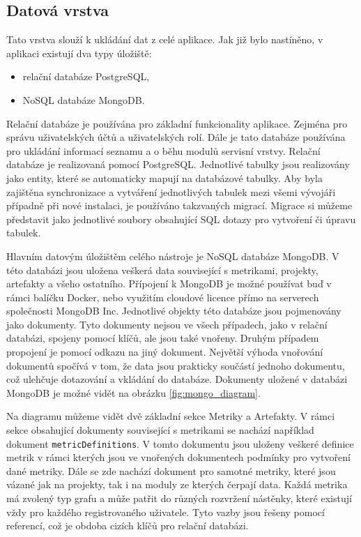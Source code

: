 \documentclass[czech,master]{diploma}
\begin{document}
\subsection{Datová vrstva}
Tato vrstva slouží k ukládání dat z celé aplikace. Jak již bylo nastíněno, v aplikaci existují dva typy úložiště:

\begin{itemize}
\item relační databáze PostgreSQL,
\item NoSQL databáze MongoDB.
\end{itemize}

Relační databáze je používána pro základní funkcionality aplikace. Zejména pro správu uživatelských účtů a uživatelských rolí. Dále je tato databáze používána pro ukládání informací seznamu a o běhu modulů servisní vrstvy. Relační databáze je realizovaná pomocí PostgreSQL. Jednotlivé tabulky jsou realizovány jako entity, které se automaticky mapují na databázové tabulky. Aby byla zajištěna synchronizace a vytváření jednotlivých tabulek mezi všemi vývojáři případně při nové instalaci, je používáno takzvaných migrací. Migrace si můžeme představit jako jednotlivé soubory obsahující SQL dotazy pro vytvoření či úpravu tabulek.

Hlavním datovým úložištěm celého nástroje je NoSQL databáze MongoDB. V této databázi jsou uložena veškerá data související s metrikami, projekty, artefakty a všeho ostatního. Přípojení k MongoDB je možné používat buď v rámci balíčku Docker, nebo využitím cloudové licence přímo na serverech společnosti MongoDB Inc. Jednotlivé objekty této databáze jsou pojmenovány jako dokumenty. Tyto dokumenty nejsou ve všech případech, jako v relační databázi, spojeny pomocí klíčů, ale jsou také vnořeny. Druhým případem propojení je pomocí odkazu na jiný dokument. Největší výhoda vnořování dokumentů spočívá v tom, že data jsou prakticky součástí jednoho dokumentu, což ulehčuje dotazování a vkládání do databáze. Dokumenty uložené v databázi MongoDB je možné vidět na obrázku \ref{fig:mongo_diagram}.

Na diagramu můžeme vidět dvě základní sekce Metriky a Artefakty. V rámci sekce obsahující dokumenty související s metrikami se nachází například dokument \texttt{metricDefinitions}. V tomto dokumentu jsou uloženy veškeré definice metrik v rámci kterých jsou ve vnořených dokumentech podmínky pro vytvoření dané metriky. Dále se zde nachází dokument pro samotné metriky, které jsou vázané jak na projekty, tak i na moduly ze kterých čerpají data. Každá metrika má zvolený typ grafu a může patřit do různých rozvržení nástěnky, které existují vždy pro každého registrovaného uživatele. Tyto vazby jsou řešeny pomocí  referencí, což je obdoba cizích klíčů pro relační databázi.
\end{document}
